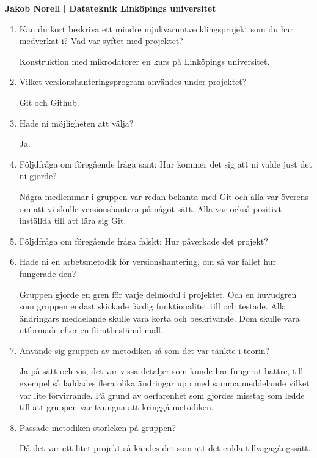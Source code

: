 \clearpage
\begin{center}
    \textbf{Jakob Norell | Datateknik Linköpings universitet}
\end{center}
\begin{enumerate}

  \item Kan du kort beskriva ett mindre mjukvaruutvecklingsprojekt som du har medverkat i? Vad var syftet med projektet?

  Konstruktion med mikrodatorer en kurs på Linköpings universitet.

  \item Vilket versionshanteringsprogram användes under projektet?

  Git och Github.

  \item Hade ni möjligheten att välja?

  Ja.

  \item Följdfråga om föregående fråga sant: Hur kommer det sig att ni valde just det ni gjorde?

  Några medlemmar i gruppen var redan bekanta med Git och alla var överens om att vi skulle versionshantera på något sätt. Alla var också positivt inställda till att lära sig Git.

  \item Följdfråga om föregående fråga falskt: Hur påverkade det projekt?

  \item Hade ni en arbetsmetodik för versionshantering, om så var fallet hur fungerade den?

  Gruppen gjorde en gren för varje delmodul i projektet. Och en huvudgren som gruppen endast skickade färdig funktionalitet till och testade. Alla ändringars meddelande skulle vara korta och beskrivande. Dom skulle vara utformade efter en förutbestämd mall.

  \item Använde sig gruppen av metodiken så som det var tänkte i teorin?

  Ja på sätt och vis, det var vissa detaljer som kunde har fungerat bättre, till exempel så laddades flera olika ändringar upp med samma meddelande vilket var lite förvirrande. På grund av oerfarenhet som gjordes misstag som ledde till att gruppen var tvungna att kringgå metodiken.

  \item Passade metodiken storleken på gruppen?

  Då det var ett litet projekt så kändes det som att det enkla tillvägagångssätt.


\end{enumerate}
